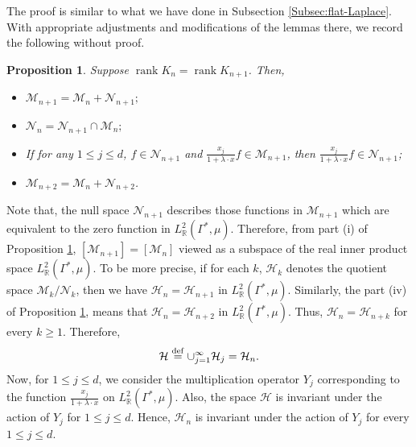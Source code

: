 \documentclass[11pt,reqno]{amsart}
\theoremstyle{plain}
\newtheorem{proposition}[theorem]{Proposition}
\theoremstyle{definition}
\numberwithin{equation}{section}
\newcommand{\rnk} {\operatorname{rank}}
\newcommand{\bydef}{\stackrel{\rm def}{=}}
\begin{document}
	The proof is similar to what we have done in Subsection \ref{Subsec:flat-Laplace}. With appropriate adjustments and modifications of the lemmas there, we record the following without proof.
	\begin{proposition}\label{Prop:Flat}
    Suppose $\operatorname{rank} K_n=\rnk K_{n+1}$. Then,
		\begin{itemize}
			\item[(i)] $\mathcal{M}_{n+1} = \mathcal{M}_n + \mathcal{N}_{n+1};$
			
			\vspace{2mm}
			\item[(ii)] $\mathcal{N}_n = \mathcal{N}_{n+1} \cap \mathcal{M}_n;$
			
			\vspace{2mm}
			\item[(iii)] If for any $1\leq j \leq d$, $f\in \mathcal{N}_{n+1}$ and $\frac{x_j}{1+ \lambda \cdot x} f \in \mathcal{M}_{n+1}$, then $\frac{x_j}{1+ \lambda \cdot x} f \in \mathcal{N}_{n+1}$;
			
			\vspace{2mm}
			\item[(iv)] $\mathcal{M}_{n+2} = \mathcal{M}_n + \mathcal{N}_{n+2}$.
			
		\end{itemize}
	\end{proposition}
	
	\vspace{3mm}
	Note that, the null space $\mathcal{N}_{n+1}$ describes those functions in $\mathcal{M}_{n+1}$ which are equivalent to the zero function in $L^2_\mathbb{R}(\Gamma^*, \mu)$. Therefore, from part (i) of Proposition \ref{Prop:Flat}, $[\mathcal{M}_{n+1}] = [\mathcal{M}_n]$ viewed as a subspace of the real inner product space $L^2_\mathbb{R}(\Gamma^*, \mu)$. To be more precise, if for each $k$, $\mathcal{H}_k$ denotes the quotient space $\mathcal{M}_k / \mathcal{N}_k$, then we have $\mathcal{H}_n = \mathcal{H}_{n+1}$ in $L^2_\mathbb{R}(\Gamma^*, \mu)$. Similarly, the part (iv) of Proposition \ref{Prop:Flat}, means that $\mathcal{H}_{n} = \mathcal{H}_{n+2}$ in $L^2_\mathbb{R}(\Gamma^*, \mu)$. Thus, $\mathcal{H}_{n} = \mathcal{H}_{n+k}$ for every $k\geq 1$. Therefore,
	\begin{align*}
		\mathcal{H} \bydef \cup_{j=1}^\infty \mathcal{H}_j = \mathcal{H}_n.
	\end{align*}
	Now, for $1\leq j \leq d$, we consider the multiplication operator $Y_j$ corresponding to the function $\frac{x_j}{1+\lambda \cdot x}$ on $L^2_\mathbb{R}(\Gamma^*, \mu)$.
	Also, the space $\mathcal{H}$ is invariant under the action of $Y_j$ for $1\leq j \leq d$. Hence, $\mathcal{H}_n$ is invariant under the action of $Y_j$ for every $1\leq j \leq d$. 
	
\end{document}
